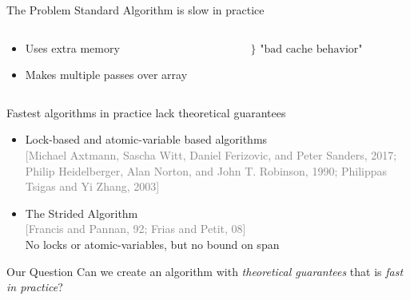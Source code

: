 \documentclass[xcolor=x11names, svgnames, rgb]{beamer}
\newcommand{\citefont}[1]{{\tiny \textcolor{Gray}{#1}}}
\begin{document}
\begin{frame}[t]{The Problem}
	Standard Algorithm is slow in practice
	\begin{columns}[T] %
	\begin{column}{.65\textwidth}
	\begin{itemize}
		\item Uses extra memory %
		\item Makes multiple passes over array
	\end{itemize}
	\end{column}
	\begin{column}{.35\textwidth}
	\hspace{-1cm}$\Biggr\}\text{ "bad cache behavior"}$
	\end{column}
	\end{columns}
	\vspace{0.4 cm}

 Fastest algorithms in practice lack theoretical guarantees
	\begin{itemize}
		\item Lock-based and atomic-variable based algorithms\\ \citefont{[Michael Axtmann, Sascha Witt, Daniel Ferizovic, and Peter Sanders, 2017; Philip Heidelberger, Alan Norton, and John T. Robinson, 1990; Philippas Tsigas and Yi Zhang, 2003]}
		\item The Strided Algorithm\\ \citefont{[Francis and Pannan, 92; Frias and Petit, 08]}\\ 
		No locks or atomic-variables, but no bound on span
	\end{itemize}
	\vspace{0.2cm}
\end{frame}

\begin{frame}[t]{Our Question}
	\vspace{1cm}
	{\Large Can we create an algorithm with \emph{theoretical guarantees} that is \emph{fast in practice}?}
\end{frame}

\end{document}
